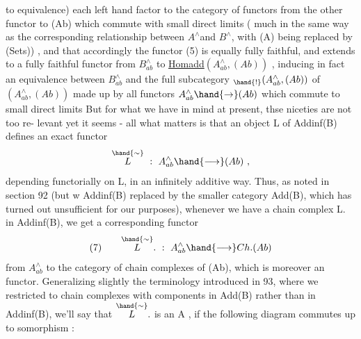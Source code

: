 
to equivalence)  each left hand factor to the category of functors
from the other functor to (Ab)  which commute with small direct limits
\xout{\unsure{(}}( much in the same way as the corresponding relationship between $A^{\wedge}$and
$B^{\wedge}$, with (A)  being replaced by (Sets))\xout{\unsure{)}} ,  and that accordingly the
functor (5) is equally fully faithful,  and extends to a fully faithful
functor from $B^{\wedge}_{ab}$ to  \uline{Homadd}$(A^{\wedge}_{ab},(Ab))$ ,  inducing in fact an equivalence
between $B^{\wedge}_{ab}$  and the full subcategory  \hand{\uline{\textcolor{black}{Hom}}}$_{\hand{!}}(A^{\wedge}_{ab},(Ab))$ of \hand{\uline{\textcolor{black}{Hom}}}$(A^{\wedge}_{ab},(Ab))$
made up by all functors  $A^{\wedge}_{ab}\hand{\to}(Ab)$  which commute to small direct limits
But for what we have in mind at present,  thse niceties are not too re-%
levant yet it seems  -  all what matters is that an object L of Addinf(B)
defines an exact functor
\[ \overset{\hand{\sim}}{L} \ : \ A^{\wedge}_{ab} \hand{\longrightarrow} (Ab) \ , \]
depending functorially on L,  in an infinitely additive way.  Thus,  as
noted in section 92  (but w Addinf(B)  replaced by the smaller
category Add(B),  which has turned out unsufficient for our purposes),
whenever we have a chain complex L.  in Addinf(B),  we get a corresponding
functor
\[ \text{(7)} \qquad \overset{\hand{\sim}}{L}. \ : \ A^{\wedge}_{ab} \hand{\longrightarrow} Ch.(Ab) \]
from $A^{\wedge}_{ab}$ to the category of chain complexes of (Ab),  which is moreover
an \hand{\uline{\textcolor{black}{exact}}} functor.  Generalizing slightly the  terminology introduced
in  93,   where we restricted to chain complexes with components in
Add(B) rather than in Addinf(B),  we'll say that  $\overset{\hand{\sim}}{L}.$  is an \hand{\uline{\textcolor{black}{abelianizator}}}
\hand{\uline{\textcolor{black}{for}}}  A  ,  if the  following diagram commutes up to somorphism :
